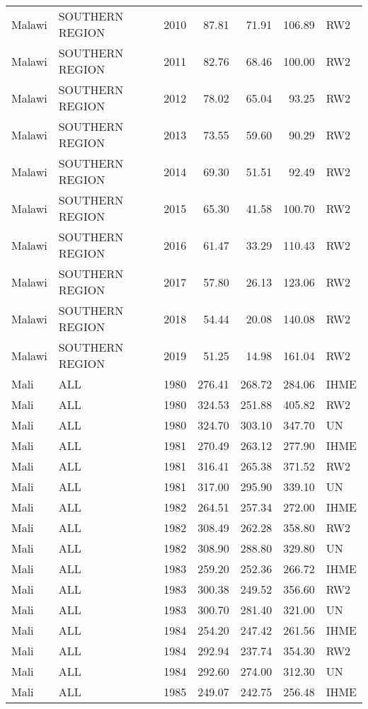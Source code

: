 \begin{longtable}{lllrrrl}
  Malawi & SOUTHERN REGION & 2010 & 87.81 & 71.91 & 106.89 & RW2 \\ 
  Malawi & SOUTHERN REGION & 2011 & 82.76 & 68.46 & 100.00 & RW2 \\ 
  Malawi & SOUTHERN REGION & 2012 & 78.02 & 65.04 & 93.25 & RW2 \\ 
  Malawi & SOUTHERN REGION & 2013 & 73.55 & 59.60 & 90.29 & RW2 \\ 
  Malawi & SOUTHERN REGION & 2014 & 69.30 & 51.51 & 92.49 & RW2 \\ 
  Malawi & SOUTHERN REGION & 2015 & 65.30 & 41.58 & 100.70 & RW2 \\ 
  Malawi & SOUTHERN REGION & 2016 & 61.47 & 33.29 & 110.43 & RW2 \\ 
  Malawi & SOUTHERN REGION & 2017 & 57.80 & 26.13 & 123.06 & RW2 \\ 
  Malawi & SOUTHERN REGION & 2018 & 54.44 & 20.08 & 140.08 & RW2 \\ 
  Malawi & SOUTHERN REGION & 2019 & 51.25 & 14.98 & 161.04 & RW2 \\ 
  Mali & ALL & 1980 & 276.41 & 268.72 & 284.06 & IHME \\ 
  Mali & ALL & 1980 & 324.53 & 251.88 & 405.82 & RW2 \\ 
  Mali & ALL & 1980 & 324.70 & 303.10 & 347.70 & UN \\ 
  Mali & ALL & 1981 & 270.49 & 263.12 & 277.90 & IHME \\ 
  Mali & ALL & 1981 & 316.41 & 265.38 & 371.52 & RW2 \\ 
  Mali & ALL & 1981 & 317.00 & 295.90 & 339.10 & UN \\ 
  Mali & ALL & 1982 & 264.51 & 257.34 & 272.00 & IHME \\ 
  Mali & ALL & 1982 & 308.49 & 262.28 & 358.80 & RW2 \\ 
  Mali & ALL & 1982 & 308.90 & 288.80 & 329.80 & UN \\ 
  Mali & ALL & 1983 & 259.20 & 252.36 & 266.72 & IHME \\ 
  Mali & ALL & 1983 & 300.38 & 249.52 & 356.60 & RW2 \\ 
  Mali & ALL & 1983 & 300.70 & 281.40 & 321.00 & UN \\ 
  Mali & ALL & 1984 & 254.20 & 247.42 & 261.56 & IHME \\ 
  Mali & ALL & 1984 & 292.94 & 237.74 & 354.30 & RW2 \\ 
  Mali & ALL & 1984 & 292.60 & 274.00 & 312.30 & UN \\ 
  Mali & ALL & 1985 & 249.07 & 242.75 & 256.48 & IHME \\ 

\end{longtable}
